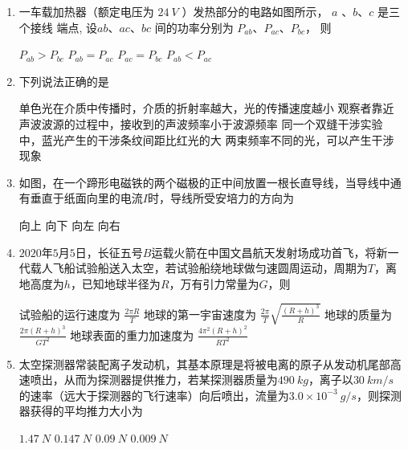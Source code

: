 \begin{enumerate}
\item
一车载加热器（额定电压为 $24 \ V$ ）发热部分的电路如图所示， $a$ 、$ b $、$ c $ 是三个接线
端点, 设$ ab $、$ ac $、$ bc $ 间的功率分别为 $P_{ab} $、$ P_{ac} $、$ P_{bc} $， 则  
\begin{figure}[h!]
\centering

\end{figure}


\fourchoices
{$P_{ab}>P_{bc}$}
{$ P_{a b}=P_{a c}$}
{$P_{ac}=P_{b c}$}
{$P_{ab}<P_{ac}$}



\item
下列说法正确的是  

\fourchoices
{单色光在介质中传播时，介质的折射率越大，光的传播速度越小}
{观察者靠近声波波源的过程中，接收到的声波频率小于波源频率}
{同一个双缝干涉实验中，蓝光产生的干涉条纹间距比红光的大}
{两束频率不同的光，可以产生干涉现象}





\item
如图，在一个蹄形电磁铁的两个磁极的正中间放置一根长直导线，当导线中通有垂直于纸面向里的电流$ I $时，导线所受安培力的方向为  
\begin{figure}[h!]
\centering

\end{figure}

\fourchoices
{向上}
{向下}
{向左}
{向右}



\item
$ 2020 $年$ 5 $月$ 5 $日，长征五号$ B $运载火箭在中国文昌航天发射场成功首飞，将新一代载人飞船试验船送入太空，若试验船绕地球做匀速圆周运动，周期为$ T $，离地高度为$ h $，已知地球半径为$ R $，万有引力常量为$ G $，则  

\fourchoices
{试验船的运行速度为 $\frac{2 \pi R}{T}$}
{地球的第一宇宙速度为 $\frac{2 \pi}{T} \sqrt{\frac{(R+h)^{3}}{R}}$}
{地球的质量为 $\frac{2 \pi(R+h)^{3}}{G T^{2}}$}
{地球表面的重力加速度为 $\frac{4 \pi^{2}(R+h)^{2}}{R T^{2}}$}

\item 
太空探测器常装配离子发动机，其基本原理是将被电离的原子从发动机尾部高速喷出，从而为探测器提供推力，若某探测器质量为$ 490 \ kg $，离子以$ 30 \ km /s $的速率（远大于探测器的飞行速率）向后喷出，流量为$ 3.0 \times 10^{-3} \ g /s $，则探测器获得的平均推力大小为  

\fourchoices
{$ 1.47 \ N $}
{$ 0.147 \ N $}
{$ 0.09 \ N $}
{$0.009 \ N $}




\end{enumerate}
